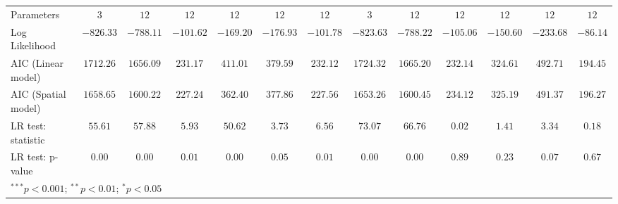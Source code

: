 \begin{table}
\begin{center}
\begin{tabular}{l c c c c c c c c c c c c}
Parameters                        & $3$           & $12$          & $12$          & $12$           & $12$          & $12$          & $3$           & $12$          & $12$          & $12$          & $12$          & $12$           \\
Log Likelihood                    & $-826.33$     & $-788.11$     & $-101.62$     & $-169.20$      & $-176.93$     & $-101.78$     & $-823.63$     & $-788.22$     & $-105.06$     & $-150.60$     & $-233.68$     & $-86.14$       \\
AIC (Linear model)                & $1712.26$     & $1656.09$     & $231.17$      & $411.01$       & $379.59$      & $232.12$      & $1724.32$     & $1665.20$     & $232.14$      & $324.61$      & $492.71$      & $194.45$       \\
AIC (Spatial model)               & $1658.65$     & $1600.22$     & $227.24$      & $362.40$       & $377.86$      & $227.56$      & $1653.26$     & $1600.45$     & $234.12$      & $325.19$      & $491.37$      & $196.27$       \\
LR test: statistic                & $55.61$       & $57.88$       & $5.93$        & $50.62$        & $3.73$        & $6.56$        & $73.07$       & $66.76$       & $0.02$        & $1.41$        & $3.34$        & $0.18$         \\
LR test: p-value                  & $0.00$        & $0.00$        & $0.01$        & $0.00$         & $0.05$        & $0.01$        & $0.00$        & $0.00$        & $0.89$        & $0.23$        & $0.07$        & $0.67$         \\
\hline
\multicolumn{13}{l}{\scriptsize{$^{***}p<0.001$; $^{**}p<0.01$; $^{*}p<0.05$}}
\end{tabular}
\label{Tab:SCSAR_Estimates_G4_Phi025}
\end{center}
\end{table}
